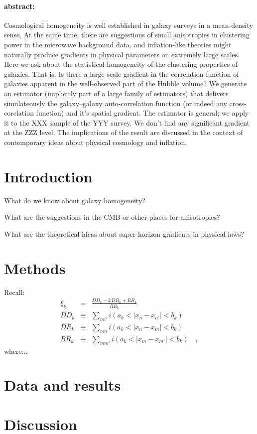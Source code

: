\documentclass[12pt, letterpaper]{article}
\begin{document}
\paragraph{abstract:}
Cosmological homogeneity is well established in galaxy surveys in a mean-density
sense.
At the same time, there are suggestions of small anisotropies in clustering power in
the microwave background data, and inflation-like theories might naturally produce
gradients in physical parameters on extremely large scales.
Here we ask about the statistical homogeneity of the clustering properties of galaxies.
That is: Is there a large-scale gradient in the correlation function of galaxies
apparent in the well-observed part of the Hubble volume?
We generate an estimator (implicitly part of a large family of estimators)
that delivers simulateously the galaxy--galaxy auto-correlation function
(or indeed any cross-corelation function)
and it's spatial gradient.
The estimator is general; we apply it to the XXX sample of the YYY survey.
We don't find any significant gradient at the ZZZ level.
The implications of the result are discussed in the context of contemporary ideas
about physical cosmology and inflation.

\section{Introduction}

What do we know about galaxy homogeneity?

What are the suggestions in the CMB or other places for anisotropies?

What are the theoretical ideas about super-horizon gradients in physical laws?

\section{Methods}

Recall:
\begin{eqnarray}
\xi_k &=& \frac{DD_k - 2\,DR_k + RR_k}{RR_k}
\\
DD_k &\equiv& \sum_{n n'} i(a_k < |x_n - x_{n'}| < b_k)
\\
DR_k &\equiv& \sum_{n m} i(a_k < |x_n - x_m| < b_k)
\\
RR_k &\equiv& \sum_{m m'} i(a_k < |x_m - x_{m'}| < b_k)
\quad ,
\end{eqnarray}
where...

\section{Data and results}

\section{Discussion}
\end{document}
